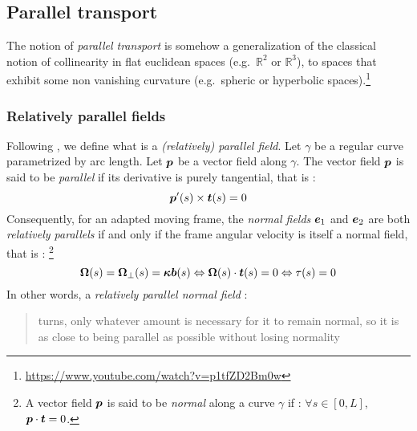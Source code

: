 \subsection{Parallel transport}\label{sec:paralleltransport}
The notion of \emph{parallel transport} is somehow a generalization of the classical notion of collinearity in flat euclidean spaces (e.g.\ $\mathbb{R}^2$ or $\mathbb{R}^3$), to spaces that exhibit some non vanishing curvature (e.g.\ spheric or hyperbolic spaces).\footnote{\url{https://www.youtube.com/watch?v=p1tfZD2Bm0w}}

\subsubsection{Relatively parallel fields}
Following \cite{Bishop1975}, we define what is a \emph{(relatively) parallel field}. Let $\gamma$ be a regular curve parametrized by arc length. Let $\boldsymbol{p}$ be a vector field along $\gamma$. The vector field $\boldsymbol{p}$ is said to be \emph{parallel} if its derivative is purely tangential, that is :
\begin{equation}
	\boldsymbol{p}'(s) \times \boldsymbol{t}(s) = 0
\end{equation}
Consequently, for an adapted moving frame, the \emph{normal fields} $\boldsymbol{e}_1$ and $\boldsymbol{e}_2$ are both \emph{relatively parallels} if and only if the frame angular velocity is itself a normal field, that is : \footnote{A vector field $\boldsymbol{p}$ is said to be \emph{normal} along a curve $\gamma$ if : $\forall s \in [0,L]$, $\boldsymbol{p}\cdot\boldsymbol{t} = 0$.}
\begin{equation}
	\boldsymbol{\Omega}(s) = \boldsymbol{\Omega}_{\perp}(s) =  \boldsymbol{\kappa b}(s) \Leftrightarrow \boldsymbol{\Omega}(s) \cdot \boldsymbol{t}(s) = 0  \Leftrightarrow \tau(s) = 0  
\end{equation}
In other words, a \emph{relatively parallel normal field} : \blockcquote{Bishop1975}{turns, only whatever amount is necessary for it to remain normal, so it is as close to being parallel as possible without losing normality}. 
%

